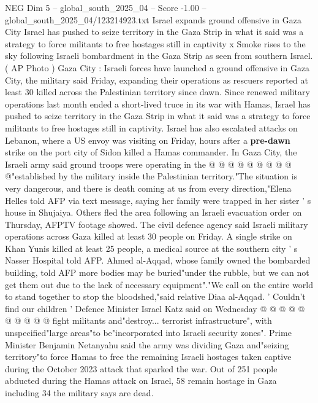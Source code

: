 \begin{textsample}{NEG Dim 5 – global\_south\_2025\_04 – Score -1.00 – global\_south\_2025\_04/123214923.txt}  \label{ex:f5_neg_363}
Israel expands ground offensive in Gaza City Israel has pushed to seize territory in the Gaza Strip in what it said was a strategy to force militants to free hostages still in captivity x Smoke rises to the sky following Israeli bombardment in the Gaza Strip as seen from southern Israel. ( AP Photo ) Gaza City : Israeli forces have launched a ground offensive in Gaza City, the military said Friday, expanding their operations as rescuers reported at least 30 killed across the Palestinian territory since dawn.
Since renewed military operations last month ended a short-lived truce in its war with Hamas, Israel has pushed to seize territory in the Gaza Strip in what it said was a strategy to force militants to free hostages still in captivity.
Israel has also escalated attacks on Lebanon, where a US envoy was visiting on Friday, hours after a \textbf{pre-dawn} strike on the port city of Sidon killed a Hamas commander.
In Gaza City, the Israeli army said ground troops were operating in the @ @ @ @ @ @ @ @ @ @"established by the military inside the Palestinian territory."The situation is very dangerous, and there is death coming at us from every direction,"Elena Helles told AFP via text message, saying her family were trapped in her sister ' s house in Shujaiya.
Others fled the area following an Israeli evacuation order on Thursday, AFPTV footage showed.
The civil defence agency said Israeli military operations across Gaza killed at least 30 people on Friday.
A single strike on Khan Yunis killed at least 25 people, a medical source at the southern city ' s Nasser Hospital told AFP.
Ahmed al-Aqqad, whose family owned the bombarded building, told AFP more bodies may be buried"under the rubble, but we can not get them out due to the lack of necessary equipment"."We call on the entire world to stand together to stop the bloodshed,"said relative Diaa al-Aqqad. ' Couldn't find our children ' Defence Minister Israel Katz said on Wednesday @ @ @ @ @ @ @ @ @ @ fight militants and"destroy... terrorist infrastructure", with unspecified"large areas"to be"incorporated into Israeli security zones".
Prime Minister Benjamin Netanyahu said the army was dividing Gaza and"seizing territory"to force Hamas to free the remaining Israeli hostages taken captive during the October 2023 attack that sparked the war.
Out of 251 people abducted during the Hamas attack on Israel, 58 remain hostage in Gaza including 34 the military says are dead.

\end{textsample}
